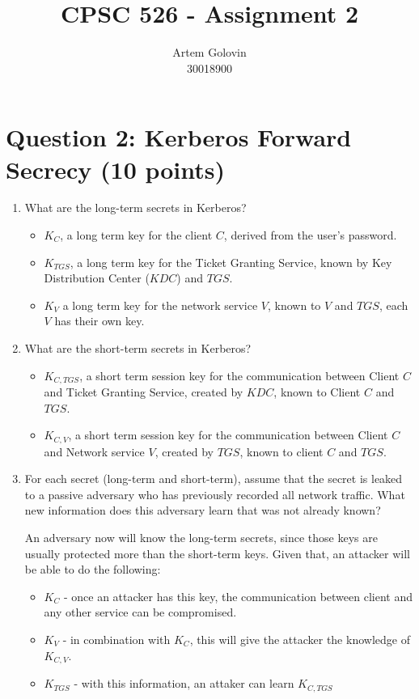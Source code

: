 \documentclass[11pt]{article}
\title{CPSC 526 - Assignment 2}
\author{Artem Golovin \\ 30018900}
\begin{document}
\maketitle

\section*{Question 2: Kerberos Forward Secrecy (10 points)}

\begin{enumerate}
    \item What are the long-term secrets in Kerberos?

    \begin{itemize}
      \item $K_{C}$, a long term key for the client $C$, derived from the user's password.
      \item $K_{TGS}$, a long term key for the Ticket Granting Service, known by Key Distribution Center ($KDC$) and $TGS$.
      \item $K_{V}$ a long term key for the network service $V$, known to $V$ and $TGS$, each $V$ has their own key.
    \end{itemize}

    \item What are the short-term secrets in Kerberos?

    \begin{itemize}
      \item $K_{C, TGS}$, a short term session key for the communication between Client $C$ and Ticket Granting Service, created by $KDC$, known to Client $C$ and $TGS$.
      \item $K_{C, V}$, a short term session key for the communication between Client $C$ and Network service $V$, created by $TGS$, known to client $C$ and $TGS$.
    \end{itemize}

    \item For each secret (long-term and short-term), assume that the secret is leaked to a passive adversary who has previously recorded all network traffic. What new information does this adversary learn that was not already known?
    
    An adversary now will know the long-term secrets, since those keys are usually protected more than the short-term keys. Given that, an attacker will be able to do the following:

    \begin{itemize}
      \item $K_{C}$ - once an attacker has this key, the communication between client and any other service can be compromised.
      \item $K_{V}$ - in combination with $K_{C}$, this will give the attacker the knowledge of $K_{C, V}$.
      \item $K_{TGS}$ - with this information, an attaker can learn $K_{C, TGS}$
    \end{itemize}


\end{enumerate}
\end{document}
